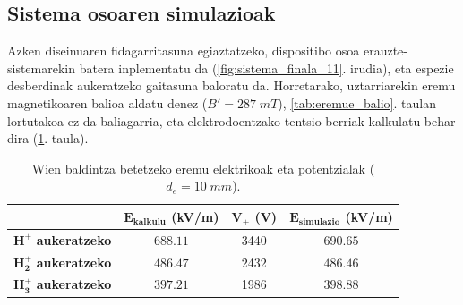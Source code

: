 \documentclass[12pt]{article}
\numberwithin{figure}{section}
\numberwithin{equation}{section}
\begin{document}
\subsection{Sistema osoaren simulazioak}
Azken diseinuaren fidagarritasuna egiaztatzeko, dispositibo osoa erauzte\hyp{}sistemarekin batera inplementatu da (\ref{fig:sistema_finala_11}. irudia), eta espezie desberdinak aukeratzeko gaitasuna baloratu da. Horretarako, uztarriarekin eremu magnetikoaren balioa aldatu denez ($B'=\num{287}\;mT$), \ref{tab:eremue_balio}. taulan lortutakoa ez da baliagarria, eta elektrodoentzako tentsio berriak kalkulatu behar dira (\ref{tab:eremue_balio_1}. taula).

\begin{table}[h]
    \centering
    \caption{Wien baldintza betetzeko eremu elektrikoak eta potentzialak ($d_e=10\;mm$).}
    \begin{tabular}{cccc}
        \toprule
        \rowcolor{gray!20}
        & $\mathbf{E_{kalkulu}}$ (kV/m) & $\mathbf{V_{\pm}}$ (V)&$\mathbf{E_{simulazio}}$ (kV/m)\\
        \midrule
        $\mathbf{H^+}$ \textbf{aukeratzeko} & $\num{688.11}$ & 3440 & $\num{690.65}$\\
        $\mathbf{H_2^+}$ \textbf{aukeratzeko} & $\num{486.47}$  & 2432 & $\num{486.46}$\\
        $\mathbf{H_3^+}$ \textbf{aukeratzeko} & $\num{397.21}$ & 1986 & $\num{398.88}$\\
        \bottomrule
    \end{tabular}
    \label{tab:eremue_balio_1}
\end{table}
\end{document}
